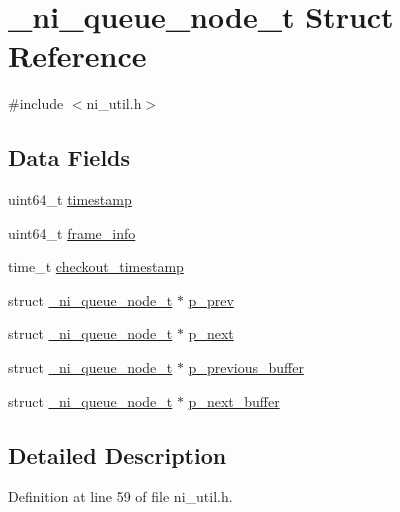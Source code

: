 \hypertarget{struct__ni__queue__node__t}{}\section{\+\_\+ni\+\_\+queue\+\_\+node\+\_\+t Struct Reference}
\label{struct__ni__queue__node__t}


{\ttfamily \#include $<$ni\+\_\+util.\+h$>$}

\subsection*{Data Fields}
\begin{DoxyCompactItemize}
\item 
uint64\+\_\+t \mbox{\hyperlink{struct__ni__queue__node__t_a465bef81f6478756e5443025b1f2ddfa}{timestamp}}
\item 
uint64\+\_\+t \mbox{\hyperlink{struct__ni__queue__node__t_a4089388889bdd62db8384f3d4f628c30}{frame\+\_\+info}}
\item 
time\+\_\+t \mbox{\hyperlink{struct__ni__queue__node__t_acb867aea9a0784db86afb340543771f6}{checkout\+\_\+timestamp}}
\item 
struct \mbox{\hyperlink{struct__ni__queue__node__t}{\+\_\+ni\+\_\+queue\+\_\+node\+\_\+t}} $\ast$ \mbox{\hyperlink{struct__ni__queue__node__t_afe8e8271ea7d7114eab3e1c041f3a4f6}{p\+\_\+prev}}
\item 
struct \mbox{\hyperlink{struct__ni__queue__node__t}{\+\_\+ni\+\_\+queue\+\_\+node\+\_\+t}} $\ast$ \mbox{\hyperlink{struct__ni__queue__node__t_afd8010f01884d7c0dc014cb57480149b}{p\+\_\+next}}
\item 
struct \mbox{\hyperlink{struct__ni__queue__node__t}{\+\_\+ni\+\_\+queue\+\_\+node\+\_\+t}} $\ast$ \mbox{\hyperlink{struct__ni__queue__node__t_a589649d11ded883cfcaaca52da500130}{p\+\_\+previous\+\_\+buffer}}
\item 
struct \mbox{\hyperlink{struct__ni__queue__node__t}{\+\_\+ni\+\_\+queue\+\_\+node\+\_\+t}} $\ast$ \mbox{\hyperlink{struct__ni__queue__node__t_ae3fb33f413180540c3055673f1b4455d}{p\+\_\+next\+\_\+buffer}}
\end{DoxyCompactItemize}


\subsection{Detailed Description}


Definition at line 59 of file ni\+\_\+util.\+h.



